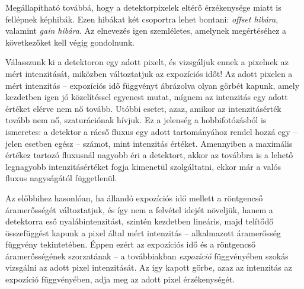 \documentclass[a4paper,12pt]{article}
\begin{document}
Megállapítható továbbá, hogy a detektorpixelek eltérő érzékenysége miatt is fellépnek képhibák. Ezen hibákat két csoportra lehet bontani: \emph{offset hibára}, valamint \emph{gain hibára}. Az elnevezés igen szemléletes, amelynek megértéséhez a következőket kell végig gondolnunk. 

Válasszunk ki a detektoron egy adott pixelt, és vizsgáljuk ennek a pixelnek az mért intenzitását, miközben változtatjuk az expozíciós időt! Az adott pixelen a mért intenzitás -- expozíciós idő függvényt ábrázolva olyan görbét kapunk, amely kezdetben igen jó közelítéssel egyenest mutat, mígnem az intenzitás egy adott értéket elérve nem nő tovább. Utóbbi esetet, azaz, amikor az intenzitásérték tovább nem nő, szaturációnak hívjuk. Ez a jelenség a hobbifotózásból is ismeretes: a detektor a ráeső fluxus egy adott tartományához rendel hozzá egy -- jelen esetben egész -- számot, mint intenzitás értéket. Amennyiben a maximális értékez tartozó fluxusnál nagyobb éri a detektort, akkor az továbbra is a lehető legnagyobb intenzitásértéket fogja kimenetül szolgáltatni, ekkor már a valós fluxus nagyságától függetlenül. 

Az előbbihez hasonlóan, ha állandó expozíciós idő mellett a röntgencső áramerősségét változtatjuk, és így nem a felvétel idejét növeljük, hanem a detektorra eső nyalábintenzitást, szintén kezdetben lineáris, majd telítődő összefüggést kapunk a pixel által mért intenzitás -- alkalmazott áramerősség függvény tekintetében. Éppen ezért az expozíciós idő és a röntgencső áramerősségének szorzatának -- a továbbiakban \emph{expozíció} függvényében szokás vizsgálni az adott pixel intenzitását. Az így kapott görbe, azaz az intenzitás az expozíció függvényében, adja meg az adott pixel érzékenységét.
\end{document}
